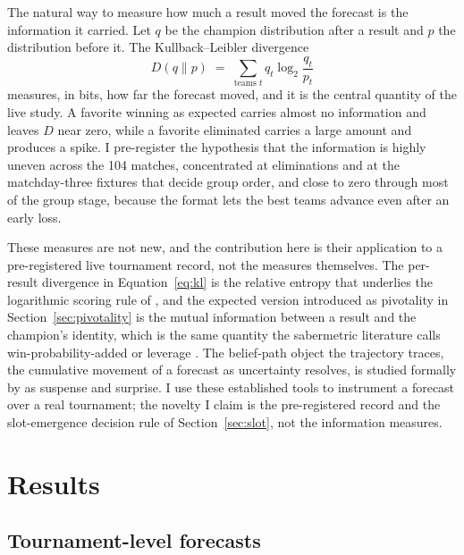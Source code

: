 \documentclass[11pt,a4paper]{article}
\begin{document}
The natural way to measure how much a result moved the forecast is the information it carried. Let $q$ be the champion distribution after a result and $p$ the distribution before it. The Kullback--Leibler divergence
\begin{equation}
D(q \parallel p) \;=\; \sum_{\text{teams } t} q_t \log_2 \frac{q_t}{p_t}
\label{eq:kl}
\end{equation}
measures, in bits, how far the forecast moved, and it is the central quantity of the live study. A favorite winning as expected carries almost no information and leaves $D$ near zero, while a favorite eliminated carries a large amount and produces a spike. I pre-register the hypothesis that the information is highly uneven across the 104 matches, concentrated at eliminations and at the matchday-three fixtures that decide group order, and close to zero through most of the group stage, because the format lets the best teams advance even after an early loss.

These measures are not new, and the contribution here is their application to a pre-registered live tournament record, not the measures themselves. The per-result divergence in Equation~\eqref{eq:kl} is the relative entropy that underlies the logarithmic scoring rule of \citet{gneiting2007}, and the expected version introduced as pivotality in Section~\ref{sec:pivotality} is the mutual information between a result and the champion's identity, which is the same quantity the sabermetric literature calls win-probability-added or leverage \citep{tango2007}. The belief-path object the trajectory traces, the cumulative movement of a forecast as uncertainty resolves, is studied formally by \citet{ely2015} as suspense and surprise. I use these established tools to instrument a forecast over a real tournament; the novelty I claim is the pre-registered record and the slot-emergence decision rule of Section~\ref{sec:slot}, not the information measures.

\section{Results}

\subsection{Tournament-level forecasts}
\end{document}
